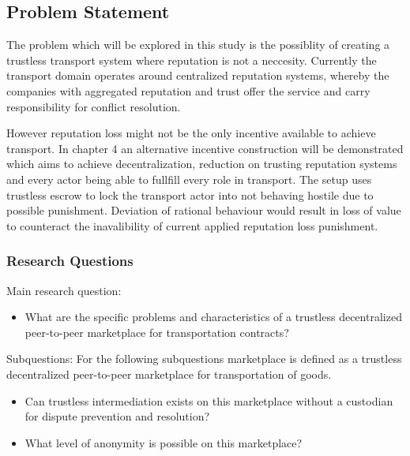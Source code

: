 \documentclass[Nomencl]{DylanMaster}
\begin{document}
\subsection{Problem Statement}

The problem which will be explored in this study is the possiblity of creating a trustless transport system where reputation is not a neccesity. Currently the transport domain operates around centralized reputation systems, whereby the companies with aggregated reputation and trust offer the service and carry responsibility for conflict resolution.\par
However reputation loss might not be the only incentive available to achieve transport. In chapter 4 an alternative incentive construction will be demonstrated which aims to achieve decentralization, reduction on trusting reputation systems and every actor being able to fullfill every role in transport. The setup uses trustless escrow to lock the transport actor into not behaving hostile due to possible punishment. Deviation of rational behaviour would result in loss of value to counteract the inavalibility of current applied reputation loss punishment.

\subsubsection{Research Questions}

\bigbreak
\noindent Main research question:
\begin{itemize}
  \item What are the specific problems and characteristics of a trustless decentralized peer-to-peer marketplace for transportation contracts?
\end{itemize}
\bigbreak
\noindent Subquestions:
\bigbreak
\noindent For the following subquestions marketplace is defined as a trustless decentralized peer-to-peer marketplace for transportation of goods.
\begin{itemize}
  \item Can trustless intermediation exists on this marketplace without a custodian for dispute prevention and resolution?
  \item What level of anonymity is possible on this marketplace?
\end{itemize}
\end{document}
